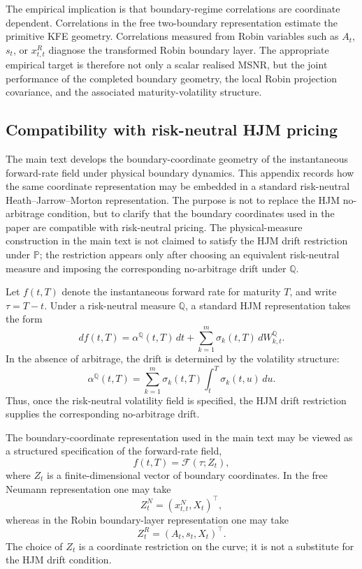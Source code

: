 \documentclass[11pt]{article}
\numberwithin{equation}{section}
\begin{document}
The empirical implication is that boundary-regime correlations are coordinate dependent. Correlations in the free two-boundary representation estimate the primitive KFE geometry. Correlations measured from Robin variables such as \(A_t\), \(s_t\), or \(x^R_{t,t}\) diagnose the transformed Robin boundary layer. The appropriate empirical target is therefore not only a scalar realised MSNR, but the joint performance of the completed boundary geometry, the local Robin projection covariance, and the associated maturity-volatility structure.



\clearpage
\begin{appendices}
\section{Compatibility with risk-neutral HJM pricing}
\label{app:hjm-pricing}

The main text develops the boundary-coordinate geometry of the instantaneous
forward-rate field under physical boundary dynamics.  This appendix records
how the same coordinate representation may be embedded in a standard
risk-neutral Heath--Jarrow--Morton representation.  The purpose is not to
replace the HJM no-arbitrage condition, but to clarify that the boundary
coordinates used in the paper are compatible with risk-neutral pricing. The physical-measure construction in the main text is not claimed to satisfy the HJM drift restriction under \(\mathbb P\); the restriction appears only after choosing an equivalent risk-neutral measure and imposing the corresponding no-arbitrage drift under \(\mathbb Q\).

Let \(f(t,T)\) denote the instantaneous forward rate for maturity \(T\), and
write \(\tau=T-t\).  Under a risk-neutral measure \(\mathbb Q\), a standard
HJM representation takes the form
\[
        df(t,T)
        =
        \alpha^{\mathbb Q}(t,T)\,dt
        +
        \sum_{k=1}^{m}\sigma_k(t,T)\,dW^{\mathbb Q}_{k,t}.
\]
In the absence of arbitrage, the drift is determined by the volatility
structure:
\[
        \alpha^{\mathbb Q}(t,T)
        =
        \sum_{k=1}^{m}
        \sigma_k(t,T)
        \int_t^T \sigma_k(t,u)\,du .
\]
Thus, once the risk-neutral volatility field is specified, the HJM drift
restriction supplies the corresponding no-arbitrage drift.

The boundary-coordinate representation used in the main text may be viewed
as a structured specification of the forward-rate field,
\[
        f(t,T)=\mathcal F(\tau;Z_t),
\]
where \(Z_t\) is a finite-dimensional vector of boundary coordinates.  In
the free Neumann representation one may take
\[
        Z^N_t=(x^N_{t,t},X_t)^\top,
\]
whereas in the Robin boundary-layer representation one may take
\[
        Z^R_t=(A_t,s_t,X_t)^\top .
\]
The choice of \(Z_t\) is a coordinate restriction on the curve; it is not a
substitute for the HJM drift condition.


\end{appendices}
\end{document}
